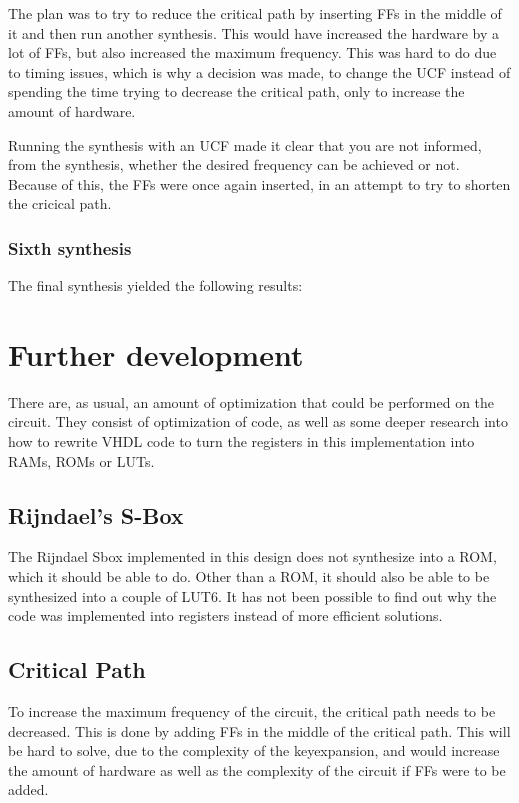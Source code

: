 The plan was to try to reduce the critical path by inserting FFs in the 
middle of it and then run another synthesis. This would have increased 
the hardware by a lot of FFs, but also increased the maximum frequency. 
This was hard to do due to timing issues, which is why a decision was 
made, to change the UCF instead of spending the time trying to 
decrease the critical path, only to increase the amount of hardware.

Running the synthesis with an UCF made it clear that you are not 
informed, from the synthesis, whether the desired frequency can be 
achieved or not. Because of this, the FFs were once again inserted, in 
an attempt to try to shorten the cricical path. 

\subsubsection{Sixth synthesis}
The final synthesis yielded the following results:

\section{Further development}
There are, as usual, an amount of optimization that could be performed 
on the circuit. They consist of optimization of code, as well as some 
deeper research into how to rewrite VHDL code to turn the registers in 
this implementation into RAMs, ROMs or LUTs.

\subsection{Rijndael's S-Box}
The Rijndael Sbox implemented in this design does not synthesize into a 
ROM, which it should be able to do. Other than a ROM, it should also be 
able to be synthesized into a couple of LUT6.
It has not been possible to find out why the code was implemented into 
registers instead of more efficient solutions.

\subsection{Critical Path}
To increase the maximum frequency of the circuit, the critical path 
needs to be decreased. This is done by adding FFs in the middle of the 
critical path. This will be hard to solve, due to the complexity of the 
keyexpansion, and would increase the amount of hardware as well as the 
complexity of the circuit if FFs were to be added.

